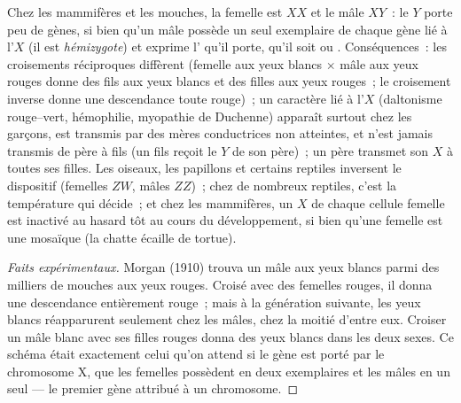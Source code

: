 \begin{proposition}\label{prop:b2:meiosis-heredity:sexlinked}
Chez les mammifères et les mouches, la femelle est $XX$ et le mâle
$XY$~: le $Y$ porte peu de gènes, si bien qu'un mâle possède un seul
exemplaire de chaque gène lié à l'$X$ (il est \emph{hémizygote}) et
exprime l' qu'il porte, qu'il soit  ou .
Conséquences~: les croisements réciproques diffèrent (femelle aux yeux
blancs $\times$ mâle aux yeux rouges donne des fils aux yeux blancs et
des filles aux yeux rouges~; le croisement inverse donne une
descendance toute rouge)~; un caractère  lié à l'$X$
(daltonisme rouge--vert, hémophilie, myopathie de Duchenne) apparaît
surtout chez les garçons, est transmis par des mères conductrices non
atteintes, et n'est jamais transmis de père à fils (un fils reçoit le
$Y$ de son père)~; un père transmet son $X$ à toutes ses filles. Les
oiseaux, les papillons et certains reptiles inversent le dispositif
(femelles $ZW$, mâles $ZZ$)~; chez de nombreux reptiles, c'est la
température qui décide~; et chez les mammifères, un $X$ de chaque
cellule femelle est inactivé au hasard tôt au cours du développement,
si bien qu'une femelle  est une mosaïque (la chatte
écaille de tortue).
\end{proposition}
\begin{proof}[Faits expérimentaux]
Morgan (1910) trouva un mâle aux yeux blancs parmi des milliers de
mouches aux yeux rouges. Croisé avec des femelles rouges, il donna une
descendance entièrement rouge~; mais à la génération suivante, les yeux
blancs réapparurent seulement chez les mâles, chez la moitié d'entre
eux. Croiser un mâle blanc avec ses filles rouges donna des yeux blancs
dans les deux sexes. Ce schéma était exactement celui qu'on attend si
le gène est porté par le chromosome X, que les femelles possèdent en
deux exemplaires et les mâles en un seul --- le premier gène attribué à
un chromosome.
\end{proof}

